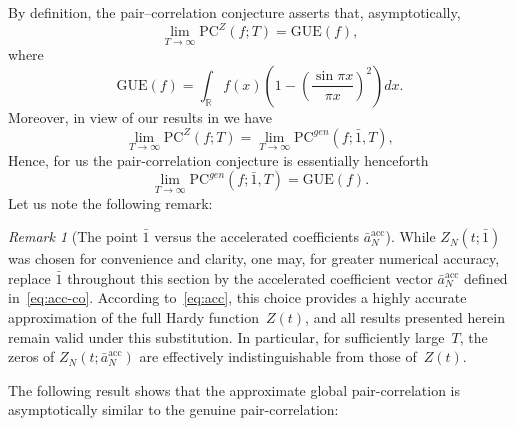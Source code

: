 \documentclass[12pt,reqno]{amsart}
\theoremstyle{plain}
\theoremstyle{definition}
\theoremstyle{remark}
\newtheorem{rem}{Remark}[section]       %
\begin{document}
By definition, the pair–correlation conjecture asserts that, asymptotically,
\begin{equation}
\lim_{T\to\infty}\mathrm{PC}^{Z}(f;T)
=\mathrm{GUE}(f),
\end{equation}
where
\begin{equation}
\mathrm{GUE}(f)
=\int_{\mathbb{R}} 
f(x)\!\left(1-\left(\frac{\sin \pi x}{\pi x}\right)^{\!2}\right)\!dx.
\end{equation}
Moreover, in view of our results in \cite{J4} we have 
\begin{equation}
\lim_{T\to\infty}\mathrm{PC}^{Z}(f;T)
= \lim_{T\to\infty}\mathrm{PC}^{gen}(f; \bar 1, T),
\end{equation}
Hence, for us the pair-correlation conjecture is essentially henceforth 
\begin{equation}
\lim_{T\to\infty}\mathrm{PC}^{gen}(f; \bar 1, T)
=\mathrm{GUE}(f).
\end{equation}
Let us note the following remark: 
\begin{rem}[The point $\bar 1$ versus the accelerated coefficients $\bar a^{\mathrm{acc}}_N$]
\label{rem:aacc}
While $Z_N(t;\bar 1)$ was chosen for convenience and clarity,
one may, for greater numerical accuracy, replace $\bar 1$ throughout this
section by the accelerated coefficient vector $\bar a^{\mathrm{acc}}_N$
defined in~\eqref{eq:acc-co}.
According to~\eqref{eq:acc}, this choice provides a highly accurate
approximation of the full Hardy function~$Z(t)$, and all results presented
herein remain valid under this substitution.
In particular, for sufficiently large~$T$, the zeros of
$Z_N(t;\bar a^{\mathrm{acc}}_N)$ are effectively indistinguishable from those
of~$Z(t)$.
\end{rem}

The following result shows that the approximate global pair-correlation is asymptotically similar to the genuine pair-correlation: 
 
\end{document}
